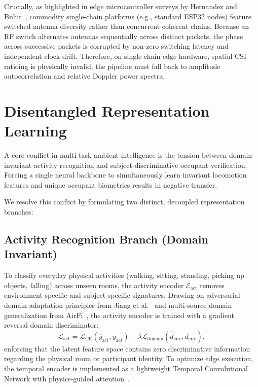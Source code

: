 Crucially, as highlighted in edge microcontroller surveys by Hernandez and Bulut~\cite{hernandez2024wifi}, commodity single-chain platforms (e.g., standard ESP32 nodes) feature switched antenna diversity rather than concurrent coherent chains. Because an RF switch alternates antennas sequentially across distinct packets, the phase across successive packets is corrupted by non-zero switching latency and independent clock drift. Therefore, on single-chain edge hardware, spatial CSI ratioing is physically invalid; the pipeline must fall back to amplitude autocorrelation and relative Doppler power spectra.

\section{Disentangled Representation Learning}
A core conflict in multi-task ambient intelligence is the tension between domain-invariant activity recognition and subject-discriminative occupant verification. Forcing a single neural backbone to simultaneously learn invariant locomotion features and unique occupant biometrics results in negative transfer.

We resolve this conflict by formulating two distinct, decoupled representation branches:
\subsection{Activity Recognition Branch (Domain Invariant)}
To classify everyday physical activities (walking, sitting, standing, picking up objects, falling) across unseen rooms, the activity encoder $\mathcal{E}_{\text{act}}$ removes environment-specific and subject-specific signatures. Drawing on adversarial domain adaptation principles from Jiang et al.~\cite{jiang2018towards} and multi-source domain generalization from AirFi~\cite{author2024airfi}, the activity encoder is trained with a gradient reversal domain discriminator:
\begin{equation}
    \mathcal{L}_{\text{act}} = \mathcal{L}_{\text{CE}}(\hat{y}_{\text{act}}, y_{\text{act}}) - \lambda \mathcal{L}_{\text{domain}}(\hat{d}_{\text{env}}, d_{\text{env}}),
\end{equation}
enforcing that the latent feature space contains zero discriminative information regarding the physical room or participant identity. To optimize edge execution, the temporal encoder is implemented as a lightweight Temporal Convolutional Network with physics-guided attention~\cite{physics2026physics}.

